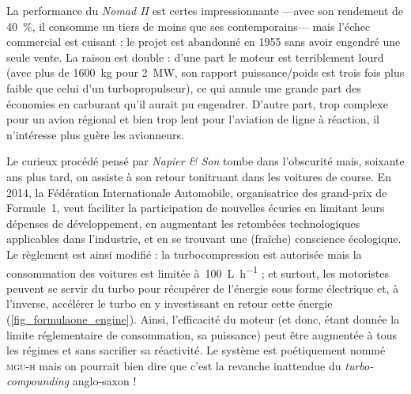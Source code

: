 La performance du \textit{Nomad II} est certes impressionnante —avec son rendement de \SI{40}{\percent}, il consomme un tiers de moins que ses contemporains— mais l’échec commercial est cuisant : le projet est abandonné en 1955 sans avoir engendré une seule vente. La raison est double : d’une part le moteur est terriblement lourd (avec plus de \SI{1600}{\kilogram} pour \SI{2}{\mega\watt}, son rapport puissance/poids est trois fois plus faible que celui d’un turbopropulseur), ce qui annule une grande part des économies en carburant qu’il aurait pu engendrer. D’autre part, trop complexe pour un avion régional et bien trop lent pour l’aviation de ligne à réaction, il n’intéresse plus guère les avionneurs.

Le curieux procédé pensé par \textit{Napier \& Son} tombe dans l’obscurité mais, soixante ans plus tard, on assiste à son retour tonitruant dans les voitures de course. En 2014, la Fédération Internationale Automobile, organisatrice des grand-prix de Formule~1, veut faciliter la participation de nouvelles écuries en limitant leurs dépenses de développement, en augmentant les retombées technologiques applicables dans l’industrie, et en se trouvant une (fraîche) conscience écologique. Le règlement est ainsi modifié : la turbocompression est autorisée mais la consommation des voitures est limitée à~\SI[per-mode=symbol]{100}{\liter\per\hour} ; et surtout, les motoristes peuvent se servir du turbo pour récupérer de l’énergie sous forme électrique et, à l’inverse, accélérer le turbo en y investissant en retour cette énergie (\cref{fig_formulaone_engine}). Ainsi, l’efficacité du moteur (et donc, étant donnée la limite réglementaire de consommation, sa puissance) peut être augmentée à tous les régimes et sans sacrifier sa réactivité. Le système est poétiquement nommé \textsc{mgu-h} mais on pourrait bien dire que c’est la revanche inattendue du \textit{turbo-compounding} anglo-saxon !


